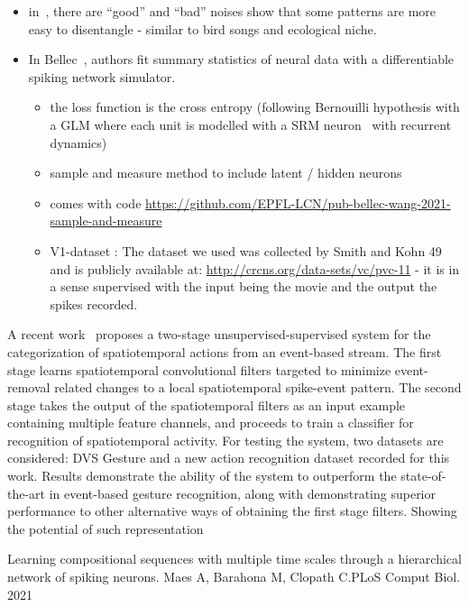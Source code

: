 \documentclass[brainsci, %
               review,submit,pdftex,moreauthors%
               ]{Definitions/mdpi}
\begin{document}
\begin{itemize}
\item
  in~\citep{agus_rapid_2010}, there are ``good'' and ``bad'' noises show that some patterns are more easy to disentangle - similar to bird songs and ecological niche.
\item
  In Bellec~\citep{bellec_fitting_2021}, authors fit summary statistics of neural data with a differentiable spiking network simulator.

  \begin{itemize}
     \item
    the loss function is the cross entropy (following Bernouilli hypothesis with a GLM where each unit is modelled with a SRM neuron~\citep{gerstner_time_1995} with recurrent dynamics)
  \item
    sample and measure method to include latent / hidden neurons
  \item
    comes with code \url{https://github.com/EPFL-LCN/pub-bellec-wang-2021-sample-and-measure}
  \item
    V1-dataset : The dataset we used was collected by Smith and Kohn 49 and is publicly available at:
     \url{http://crcns.org/data-sets/vc/pvc-11} - it is in a sense supervised with the input being the movie and the output the spikes recorded.
  \end{itemize}
\end{itemize}

A recent work~\citep{ghosh_spatiotemporal_2019} proposes a two-stage unsupervised-supervised system for the categorization of spatiotemporal actions from an event-based stream. The first stage learns spatiotemporal convolutional filters targeted to minimize event-removal related changes to a local spatiotemporal spike-event pattern. The second stage takes the output of the spatiotemporal filters as an input example containing multiple feature channels, and proceeds to train a classifier for recognition of spatiotemporal activity. For testing the system, two datasets are considered: DVS Gesture and a new action recognition dataset recorded for this work. Results demonstrate the ability of the system to outperform the state-of-the-art in event-based gesture recognition, along with demonstrating superior performance to other alternative ways of obtaining the first stage filters. Showing the potential of such representation

Learning compositional sequences with multiple time scales through a hierarchical network of spiking neurons.
Maes A, Barahona M, Clopath C.PLoS Comput Biol. 2021
\end{document}
